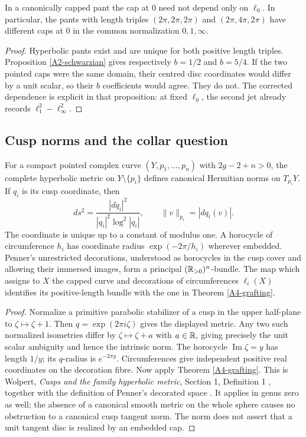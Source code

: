 \begin{theorem}\label{A2-independence}
In a canonically capped pant the cap at $0$ need not depend only on $\ell_0$. In particular, the pants with length triples $(2\pi,2\pi,2\pi)$ and $(2\pi,4\pi,2\pi)$ have different caps at $0$ in the common normalization $0,1,\infty$.
\end{theorem}
\begin{proof}
Hyperbolic pants exist and are unique for both positive length triples. Proposition \ref{A2-schwarzian} gives respectively $b=1/2$ and $b=5/4$. If the two pointed caps were the same domain, their centred disc coordinates would differ by a unit scalar, so their $b$ coefficients would agree. They do not. The corrected dependence is explicit in that proposition: at fixed $\ell_0$, the second jet already records $\ell_1^2-\ell_\infty^2$.
\end{proof}




\subsection{Cusp norms and the collar question}
\begin{proposition}\label{A2-cusp-norm}
For a compact pointed complex curve $(Y,p_1,\ldots,p_n)$ with $2g-2+n>0$, the complete hyperbolic metric on $Y\setminus\{p_i\}$ defines canonical Hermitian norms on $T_{p_i}Y$. If $q_i$ is its cusp coordinate, then
\[
 ds^2=\frac{|dq_i|^2}{|q_i|^2\log^2|q_i|},\qquad
 \|v\|_{p_i}=|dq_i(v)|.
\]
The coordinate is unique up to a constant of modulus one. A horocycle of circumference $h_i$ has coordinate radius $\exp(-2\pi/h_i)$ wherever embedded. Penner's unrestricted decorations, understood as horocycles in the cusp cover and allowing their immersed images, form a principal $({\mathbb{R}}_{>0})^n$-bundle. The map which assigns to $X$ the capped curve and decorations of circumferences $\ell_i(X)$ identifies its positive-length bundle with the one in Theorem \ref{A4-grafting}.
\end{proposition}
\begin{proof}
Normalize a primitive parabolic stabilizer of a cusp in the upper half-plane to $\zeta\mapsto\zeta+1$. Then $q=\exp(2\pi i\zeta)$ gives the displayed metric. Any two such normalized isometries differ by $\zeta\mapsto\zeta+a$ with $a\in{\ensuremath{\mathbb{R}}}$, giving precisely the unit scalar ambiguity and hence the intrinsic norm. The horocycle $\operatorname{Im}\zeta=y$ has length $1/y$; its $q$-radius is $e^{-2\pi y}$. Circumferences give independent positive real coordinates on the decoration fibre. Now apply Theorem \ref{A4-grafting}. This is Wolpert, \emph{Cusps and the family hyperbolic metric}, Section 1, Definition 1 \cite{AWolpertCusps2007}, together with the definition of Penner's decorated space \cite[Section 3, pp.~309--310]{APenner1987}. It applies in genus zero as well; the absence of a canonical smooth metric on the whole sphere causes no obstruction to a canonical cusp tangent norm. The norm does not assert that a unit tangent disc is realized by an embedded cap.
\end{proof}

